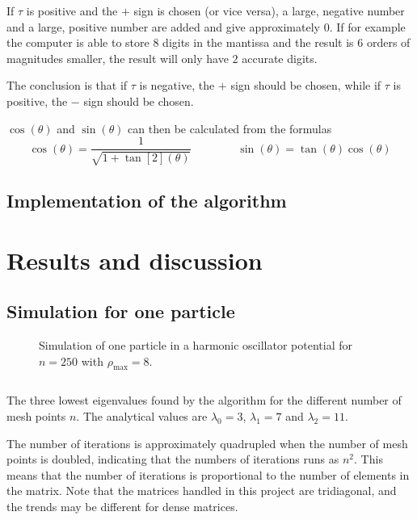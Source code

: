 \documentclass[12pt,english,a4paper]{report}
\begin{document}
If \(\tau\) is positive and the \(+\) sign is chosen (or vice versa), a large, negative number and a large, positive number are added and give approximately \(0\). If for example the computer is able to store \(8\) digits in the mantissa and the result is \(6\) orders of magnitudes smaller, the result will only have \(2\) accurate digits.

The conclusion is that if \(\tau\) is negative, the \(+\) sign should be chosen, while if \(\tau\) is positive, the \(-\) sign should be chosen.

\(\cos(\theta)\) and \(\sin(\theta)\) can then be calculated from the formulas
\[
\cos(\theta)=\frac{1}{\sqrt{1+\tan[2](\theta)}}\qquad\qquad \sin(\theta)=\tan(\theta)\cos(\theta)
\]

\clearpage
\subsection{Implementation of the algorithm}







\section{Results and discussion}
\subsection{Simulation for one particle}
\begin{figure}[H]
\centering

\caption{Simulation of one particle in a harmonic oscillator potential for \(n=250\) with \(\rho_{\max}=8\).}
\end{figure}

\begin{table}[H]
\[

\]
\caption{The three lowest eigenvalues found by the algorithm for the different number of mesh points \(n\). The analytical values are \(\lambda_0=3\), \(\lambda_1=7\) and \(\lambda_2=11\).}
\end{table}
The number of iterations is approximately quadrupled when the number of mesh points is doubled, indicating that the numbers of iterations runs as \(n^2\). This means that the number of iterations is proportional to the number of elements in the matrix. Note that the matrices handled in this project are tridiagonal, and the trends may be different for dense matrices.
\end{document}
